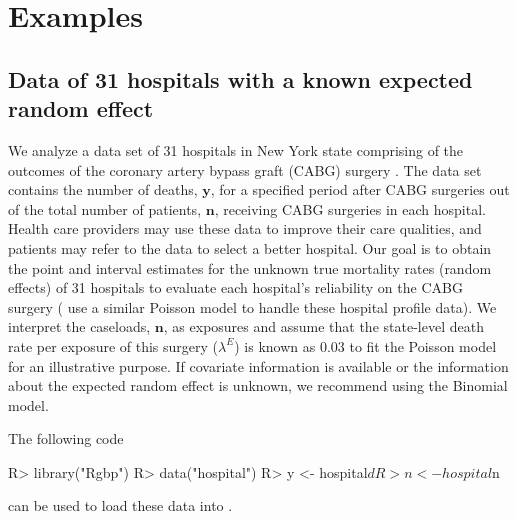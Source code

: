 \documentclass[article]{jss}
\begin{document}


\section[Examples]{Examples}\label{sec6}
\subsection[Known Second-level Mean]{Data of 31 hospitals with a known expected random effect}
\label{sec:ex:hosp}


We analyze a data set of 31 hospitals in New York state comprising of the outcomes of the coronary artery bypass graft (CABG) surgery \citep{morris2012}. The data set contains the number of deaths, $\boldsymbol{y}$, for a specified period after CABG surgeries out of the total number of patients, $\boldsymbol{n}$, receiving CABG surgeries in each hospital. Health care providers may use these data to improve their care qualities, and patients may refer to the data to select a better hospital. Our goal is to obtain the point and interval estimates for the unknown true mortality rates (random effects) of 31 hospitals to evaluate  each hospital's reliability on the CABG surgery (\cite{morris1995} use a similar Poisson model to handle these hospital profile data). We interpret the caseloads, $\boldsymbol{n}$,  as exposures and assume that the state-level death rate per exposure of this surgery ($\lambda^E$) is known as 0.03 to fit the Poisson model for an illustrative purpose.  If covariate information is available or the information about the expected random effect is unknown, we recommend using the Binomial model.

The following code
\begin{CodeChunk}
\begin{CodeInput}
R> library("Rgbp")
R> data("hospital")
R> y <- hospital$d
R> n <- hospital$n
\end{CodeInput}
\end{CodeChunk}
can be used to load these data into .
\end{document}
